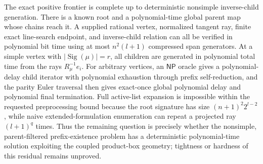 The exact positive frontier is complete up to deterministic nonsimple inverse-child generation. There is a known root and a polynomial-time global parent map whose chains reach it. A supplied rational vertex, normalized tangent ray, finite exact line-search endpoint, and inverse-child relation can all be verified in polynomial bit time using at most \(n^2(l+1)\) compressed span generators. At a simple vertex with \(|\operatorname{Sig}(\mu)|=r\), all children are generated in polynomial total time from the rays \(R_\mu^{-1}e_i\). For arbitrary vertices, an \(\mathsf{NP}\) oracle gives a polynomial-delay child iterator with polynomial exhaustion through prefix self-reduction, and the parity Euler traversal then gives exact-once global polynomial delay and polynomial final termination. Full active-list expansion is impossible within the requested preprocessing bound because the root signature has size \((n+1)^2 2^{l-2}\), while naive extended-formulation enumeration can repeat a projected ray \((l+1)^q\) times. Thus the remaining question is precisely whether the nonsimple, parent-filtered prefix-existence problem has a deterministic polynomial-time solution exploiting the coupled product-box geometry; tightness or hardness of this residual remains unproved.